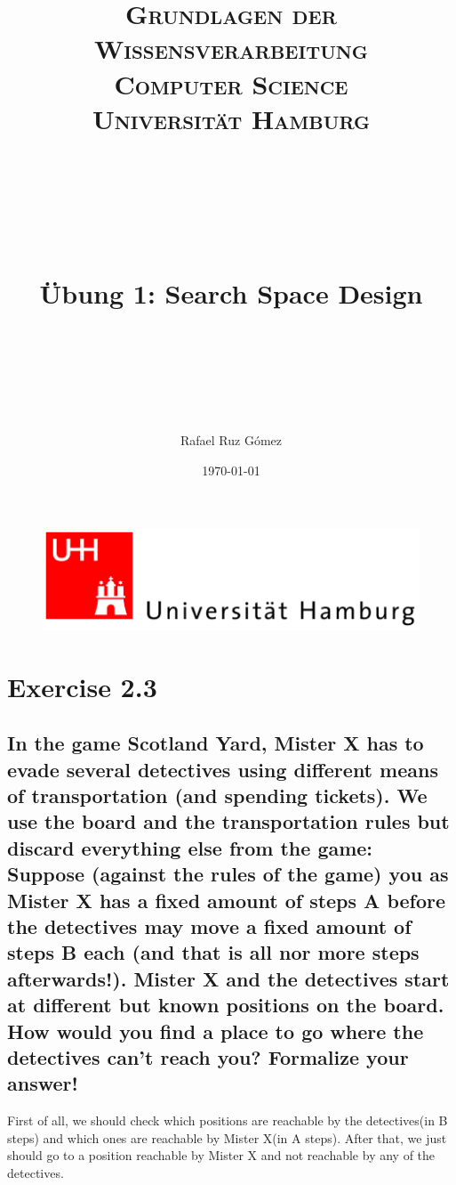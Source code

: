 \documentclass[paper=a4, fontsize=11pt]{scrartcl} %
\title{	
\normalfont \normalsize 
\textsc{\textbf{Grundlagen der Wissensverarbeitung} \\ Computer Science \\ Universität Hamburg} \\ [25pt] %
~\\
~\\
~\\
\horrule{0.5pt} \\[0.4cm] %
\Huge Übung 1: Search Space Design \\ %
\horrule{2pt} \\[0.5cm] %
~\\
~\\
}
\author{Rafael Ruz Gómez} %
\date{\normalsize\today} %
\numberwithin{equation}{section} %
\numberwithin{figure}{section} %
\numberwithin{table}{section} %
\begin{document}
\maketitle %

\begin{figure}
	\centering
	\includegraphics[scale=0.8]{logo_uni_hamburg.png}
\end{figure}

\newpage %





\section{Exercise 2.3}

\subsection{In the game Scotland Yard, Mister X has to evade several detectives using different means of transportation (and spending tickets). We use the board and the transportation rules but discard everything else from the game: Suppose (against the rules of the game) you as Mister X has a fixed amount of steps A before the detectives may move a fixed amount of steps B each (and that is all nor more steps afterwards!). Mister X and the detectives start at different but known positions on the board. How would you find a place to go where the detectives can't reach you? Formalize your answer!}

First of all, we should check which positions are reachable by the detectives(in B steps) and which ones are reachable by Mister X(in A steps). After that, we just should go to a position reachable by Mister X and not reachable by any of the detectives.


\end{document}

